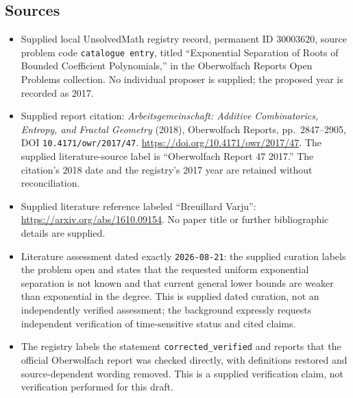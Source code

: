 \documentclass[11pt]{article}
\begin{document}
\subsection{Sources}
\begin{itemize}
\item Supplied local UnsolvedMath registry record, permanent ID \(30003620\), source problem code \texttt{catalogue entry}, titled ``Exponential Separation of Roots of Bounded Coefficient Polynomials,'' in the Oberwolfach Reports Open Problems collection. No individual proposer is supplied; the proposed year is recorded as 2017.
\item Supplied report citation: \emph{Arbeitsgemeinschaft: Additive Combinatorics, Entropy, and Fractal Geometry} (2018), Oberwolfach Reports, pp.~2847--2905, DOI \texttt{10.4171/owr/2017/47}. \url{https://doi.org/10.4171/owr/2017/47}. The supplied literature-source label is ``Oberwolfach Report 47 2017.'' The citation's 2018 date and the registry's 2017 year are retained without reconciliation.
\item Supplied literature reference labeled ``Breuillard Varju'': \url{https://arxiv.org/abs/1610.09154}. No paper title or further bibliographic details are supplied.
\item Literature assessment dated exactly \texttt{2026-08-21}: the supplied curation labels the problem open and states that the requested uniform exponential separation is not known and that current general lower bounds are weaker than exponential in the degree. This is supplied dated curation, not an independently verified assessment; the background expressly requests independent verification of time-sensitive status and cited claims.
\item The registry labels the statement \texttt{corrected\_verified} and reports that the official Oberwolfach report was checked directly, with definitions restored and source-dependent wording removed. This is a supplied verification claim, not verification performed for this draft.
\end{itemize}
\end{document}
